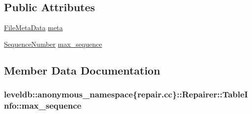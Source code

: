 \subsection*{Public Attributes}
\begin{DoxyCompactItemize}
\item 
\hyperlink{structleveldb_1_1_file_meta_data}{File\+Meta\+Data} \hyperlink{structleveldb_1_1anonymous__namespace_02repair_8cc_03_1_1_repairer_1_1_table_info_aa6916218e7df44e2ecffd3e4f568f5c7}{meta}
\item 
\hyperlink{namespaceleveldb_a5481ededd221c36d652c371249f869fa}{Sequence\+Number} \hyperlink{structleveldb_1_1anonymous__namespace_02repair_8cc_03_1_1_repairer_1_1_table_info_a7ff94ee179b0065ec33a0591b256d8d5}{max\+\_\+sequence}
\end{DoxyCompactItemize}


\subsection{Member Data Documentation}
\hypertarget{structleveldb_1_1anonymous__namespace_02repair_8cc_03_1_1_repairer_1_1_table_info_a7ff94ee179b0065ec33a0591b256d8d5}{}
\subsubsection[{max\+\_\+sequence}]{ leveldb\+::anonymous\+\_\+namespace\{repair.\+cc\}\+::Repairer\+::\+Table\+Info\+::max\+\_\+sequence}\label{structleveldb_1_1anonymous__namespace_02repair_8cc_03_1_1_repairer_1_1_table_info_a7ff94ee179b0065ec33a0591b256d8d5}
\hypertarget{structleveldb_1_1anonymous__namespace_02repair_8cc_03_1_1_repairer_1_1_table_info_aa6916218e7df44e2ecffd3e4f568f5c7}{}
